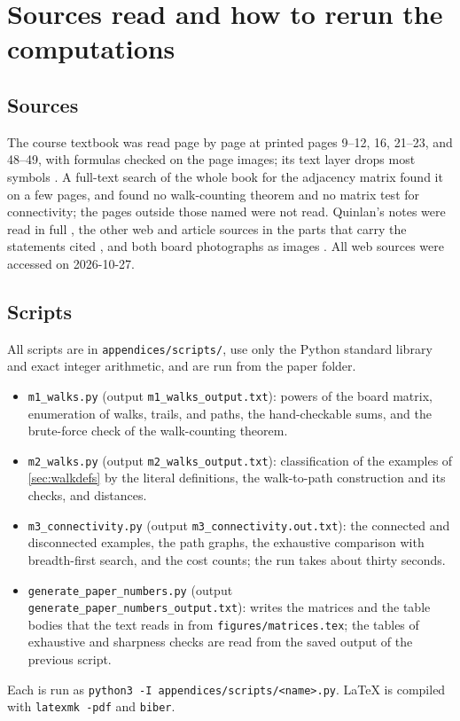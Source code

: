 \section{Sources read and how to rerun the computations}\label{app:repro}

\subsection{Sources}\label{sec:sourcesread}

The course textbook was read page by page at printed pages 9--12, 16, 21--23, and 48--49, with formulas checked on the page images; its text layer drops most symbols \cite{petrosyan2015grafneri}.
A full-text search of the whole book for the adjacency matrix found it on a few pages, and found no walk-counting theorem and no matrix test for connectivity; the pages outside those named were not read.
Quinlan's notes were read in full \cite{quinlan_matrices_graphs}, the other web and article sources in the parts that carry the statements cited \cite{grinberg2025graph,lehman_mcs_adjacency,paramadevan2021adjacency,bai2025adjacency,weisstein_connectedgraph,wikipedia_path_graph_theory,schost2026bfs}, and both board photographs as images \cite{whiteboard1,whiteboard2}.
All web sources were accessed on 2026-10-27.

\subsection{Scripts}\label{sec:scripts}

All scripts are in \texttt{appendices/scripts/}, use only the Python standard library and exact integer arithmetic, and are run from the paper folder.
\begin{itemize}
\item \texttt{m1\_walks.py} (output \texttt{m1\_walks\_output.txt}): powers of the board matrix, enumeration of walks, trails, and paths, the hand-checkable sums, and the brute-force check of the walk-counting theorem.
\item \texttt{m2\_walks.py} (output \texttt{m2\_walks\_output.txt}): classification of the examples of \cref{sec:walkdefs} by the literal definitions, the walk-to-path construction and its checks, and distances.
\item \texttt{m3\_connectivity.py} (output \texttt{m3\_connectivity.out.txt}): the connected and disconnected examples, the path graphs, the exhaustive comparison with breadth-first search, and the cost counts; the run takes about thirty seconds.
\item \texttt{generate\_paper\_numbers.py} (output \texttt{generate\_paper\_numbers\_output.txt}): writes the matrices and the table bodies that the text reads in from \texttt{figures/matrices.tex}; the tables of exhaustive and sharpness checks are read from the saved output of the previous script.
\end{itemize}
Each is run as \texttt{python3 -I appendices/scripts/<name>.py}.
LaTeX is compiled with \texttt{latexmk -pdf} and \texttt{biber}.
